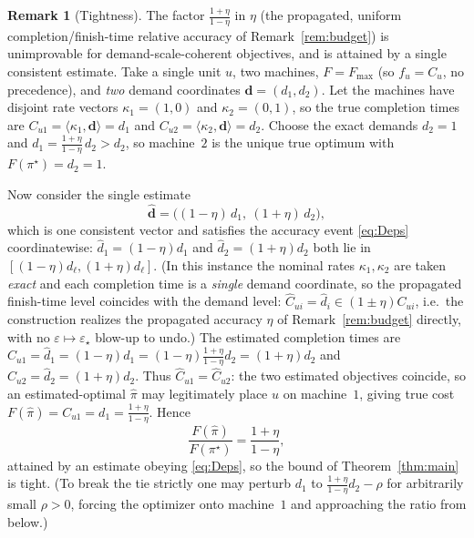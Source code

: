 \documentclass{amsart}
\theoremstyle{definition}
\newtheorem{remark}{Remark}
\begin{document}
\begin{remark}[Tightness]\label{rem:tight}
The factor $\frac{1+\eta}{1-\eta}$ in $\eta$ (the propagated, uniform
completion/finish-time relative accuracy of Remark~\ref{rem:budget}) is
unimprovable for demand-scale-coherent objectives, and is attained by a single
consistent estimate. Take a single unit $u$, two machines, $F=F_{\max}$ (so $f_u=C_u$, no
precedence), and \emph{two} demand coordinates $\mathbf d=(d_1,d_2)$. Let the
machines have disjoint rate vectors $\kappa_1=(1,0)$ and $\kappa_2=(0,1)$, so the
true completion times are $C_{u1}=\langle\kappa_1,\mathbf d\rangle=d_1$ and
$C_{u2}=\langle\kappa_2,\mathbf d\rangle=d_2$. Choose the exact demands
$d_2=1$ and $d_1=\frac{1+\eta}{1-\eta}\,d_2>d_2$, so machine~$2$ is
the unique true optimum with $F(\pi^\star)=d_2=1$.

Now consider the single estimate
\[
\widehat{\mathbf d}=\big((1-\eta)\,d_1,\ (1+\eta)\,d_2\big),
\]
which is one consistent vector and satisfies the accuracy event \eqref{eq:Deps}
coordinatewise: $\widehat d_1=(1-\eta)d_1$ and
$\widehat d_2=(1+\eta)d_2$ both lie in $[(1-\eta)d_\ell,
(1+\eta)d_\ell]$. (In this instance the nominal rates $\kappa_1,\kappa_2$ are
taken \emph{exact} and each completion time is a \emph{single} demand
coordinate, so the propagated finish-time level coincides with the demand level:
$\widehat C_{ui}=\widehat d_i\in(1\pm\eta)C_{ui}$, i.e.\ the construction
realizes the propagated accuracy $\eta$ of Remark~\ref{rem:budget} directly,
with no $\varepsilon\mapsto\varepsilon_\star$ blow-up to undo.) The estimated completion times are
$\widehat C_{u1}=\widehat d_1=(1-\eta)d_1
=(1-\eta)\frac{1+\eta}{1-\eta}d_2=(1+\eta)d_2$ and
$\widehat C_{u2}=\widehat d_2=(1+\eta)d_2$. Thus
$\widehat C_{u1}=\widehat C_{u2}$: the two estimated objectives coincide, so an
estimated-optimal $\hat\pi$ may legitimately place $u$ on machine~$1$, giving
true cost $F(\hat\pi)=C_{u1}=d_1=\frac{1+\eta}{1-\eta}$. Hence
\[
\frac{F(\hat\pi)}{F(\pi^\star)}=\frac{1+\eta}{1-\eta},
\]
attained by an estimate obeying \eqref{eq:Deps}, so the bound of
Theorem~\ref{thm:main} is tight. (To break the tie strictly one may perturb
$d_1$ to $\frac{1+\eta}{1-\eta}d_2-\rho$ for arbitrarily small
$\rho>0$, forcing the optimizer onto machine~$1$ and approaching the ratio from
below.)
\end{remark}
\end{document}
